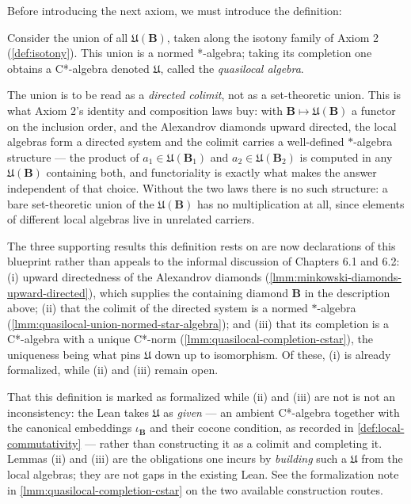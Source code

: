 Before introducing the next axiom, we must introduce the definition:

\begin{definition}
    \label{def:quasilocal-algebra}
    \leanok
    Consider the union of all $\mathfrak{U}(\mathbf{B})$, taken along the isotony family of Axiom 2 (\ref{def:isotony}). This union is a normed *-algebra; taking its completion one obtains a C*-algebra denoted $\mathfrak{U}$, called the \textit{quasilocal algebra}.

    The union is to be read as a \emph{directed colimit}, not as a set-theoretic union. This is what Axiom 2's identity and composition laws buy: with $\mathbf{B} \mapsto \mathfrak{U}(\mathbf{B})$ a functor on the inclusion order, and the Alexandrov diamonds upward directed, the local algebras form a directed system and the colimit carries a well-defined $*$-algebra structure --- the product of $a_1 \in \mathfrak{U}(\mathbf{B}_1)$ and $a_2 \in \mathfrak{U}(\mathbf{B}_2)$ is computed in any $\mathfrak{U}(\mathbf{B})$ containing both, and functoriality is exactly what makes the answer independent of that choice. Without the two laws there is no such structure: a bare set-theoretic union of the $\mathfrak{U}(\mathbf{B})$ has no multiplication at all, since elements of different local algebras live in unrelated carriers.

    The three supporting results this definition rests on are now declarations of this blueprint rather than appeals to the informal discussion of Chapters 6.1 and 6.2: (i) upward directedness of the Alexandrov diamonds (\ref{lmm:minkowski-diamonds-upward-directed}), which supplies the containing diamond $\mathbf{B}$ in the description above; (ii) that the colimit of the directed system is a normed $*$-algebra (\ref{lmm:quasilocal-union-normed-star-algebra}); and (iii) that its completion is a C*-algebra with a unique C*-norm (\ref{lmm:quasilocal-completion-cstar}), the uniqueness being what pins $\mathfrak{U}$ down up to isomorphism. Of these, (i) is already formalized, while (ii) and (iii) remain open.

    That this definition is marked as formalized while (ii) and (iii) are not is not an inconsistency: the Lean takes $\mathfrak{U}$ as \emph{given} --- an ambient C*-algebra together with the canonical embeddings $\iota_{\mathbf{B}}$ and their cocone condition, as recorded in \ref{def:local-commutativity} --- rather than constructing it as a colimit and completing it. Lemmas (ii) and (iii) are the obligations one incurs by \emph{building} such a $\mathfrak{U}$ from the local algebras; they are not gaps in the existing Lean. See the formalization note in \ref{lmm:quasilocal-completion-cstar} on the two available construction routes.
\end{definition}

